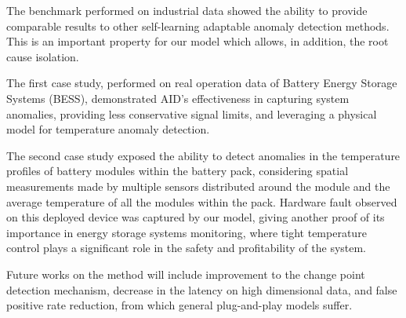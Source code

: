 The benchmark performed on industrial data showed the ability to provide comparable results to other self-learning adaptable anomaly detection methods. This is an important property for our model which allows, in addition, the root cause isolation.

The first case study, performed on real operation data of Battery Energy Storage Systems (BESS), demonstrated AID's effectiveness in capturing system anomalies, providing less conservative signal limits, and leveraging a physical model for temperature anomaly detection.

The second case study exposed the ability to detect anomalies in the temperature profiles of battery modules within the battery pack, considering spatial measurements made by multiple sensors distributed around the module and the average temperature of all the modules within the pack. Hardware fault observed on this deployed device was captured by our model, giving another proof of its importance in energy storage systems monitoring, where tight temperature control plays a significant role in the safety and profitability of the system.

Future works on the method will include improvement to the change point detection mechanism, decrease in the latency on high dimensional data, and false positive rate reduction, from which general plug-and-play models suffer.

